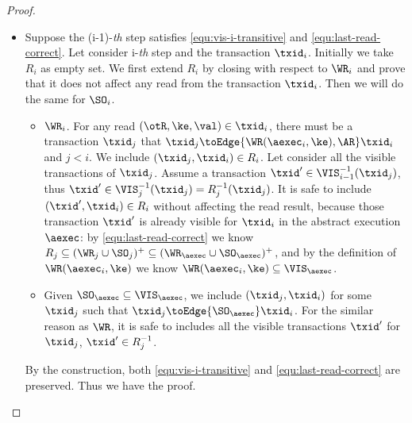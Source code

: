 \begin{proof}
\begin{itemize}
    \item {}
    Suppose the (i-1)-\emph{th} step satisfies \cref{equ:vis-i-transitive} and \cref{equ:last-read-correct}.
    Let consider i-\emph{th} step and the transaction \( \txid_i \).
    Initially we take \( R_i \) as empty set.
    We first extend \( R_i \) by closing with respect to \( \WR_i \)
    and prove that it does not affect any read from the transaction \( \txid_i \).
    Then we will do the same for \( \SO_i \).
    \begin{itemize}
        \item \( \WR_i\). For any read \( (\otR, \ke, \val ) \in \txid_i \),
        there must be a transaction \( \txid_j \) that \( \txid_j \toEdge{\WR(\aexec_i,\ke), \AR} \txid_i \) and \( j < i \).
        We include \( (\txid_j, \txid_i) \in R_i \).
        Let consider all the visible transactions of \( \txid_j \).
        Assume a transaction \( \txid' \in \VIS_{i-1}^{-1}(\txid_j) \), 
        thus \( \txid' \in \VIS_{j}^{-1}(\txid_j) = R_j^{-1}(\txid_j) \).
        It is safe to include \( (\txid', \txid_i) \in R_i \) without affecting the read result,
        because those transaction \( \txid' \) is already visible for \( \txid_i \) in the abstract execution \( \aexec \):
        by \cref{equ:last-read-correct} we know \( R_j \subseteq (\WR_j \cup \SO_j)^{+} \subseteq (\WR_\aexec \cup \SO_\aexec)^{+}\),
        and by the definition of \( \WR(\aexec_i,\ke) \) we know \( \WR(\aexec_i,\ke) \subseteq \VIS_\aexec\).

        \item Given \( \SO_\aexec \subseteq \VIS_\aexec \), we include \( (\txid_j,\txid_i) \) for some \( \txid_j \)
        such that \( \txid_j \toEdge{\SO_\aexec} \txid_i\).
        For the similar reason as \( \WR \),
        it is safe to includes all the visible transactions \( \txid' \) for \( \txid_j \), \ie \( \txid' \in R_j^{-1}\).
        \end{itemize}
        
    By the construction, both \cref{equ:vis-i-transitive} and \cref{equ:last-read-correct} are preserved. 
    Thus we have the proof.
    \end{itemize}
\end{proof}


